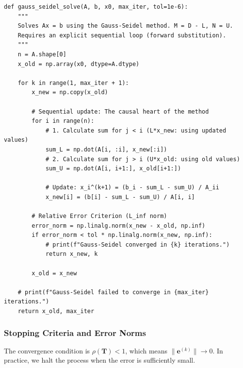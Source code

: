 \begin{verbatim}
def gauss_seidel_solve(A, b, x0, max_iter, tol=1e-6):
    """
    Solves Ax = b using the Gauss-Seidel method. M = D - L, N = U.
    Requires an explicit sequential loop (forward substitution).
    """
    n = A.shape[0]
    x_old = np.array(x0, dtype=A.dtype)
    
    for k in range(1, max_iter + 1):
        x_new = np.copy(x_old)
        
        # Sequential update: The causal heart of the method
        for i in range(n):
            # 1. Calculate sum for j < i (L*x_new: using updated values)
            sum_L = np.dot(A[i, :i], x_new[:i])
            # 2. Calculate sum for j > i (U*x_old: using old values)
            sum_U = np.dot(A[i, i+1:], x_old[i+1:])
            
            # Update: x_i^(k+1) = (b_i - sum_L - sum_U) / A_ii
            x_new[i] = (b[i] - sum_L - sum_U) / A[i, i]
        
        # Relative Error Criterion (L_inf norm)
        error_norm = np.linalg.norm(x_new - x_old, np.inf)
        if error_norm < tol * np.linalg.norm(x_new, np.inf):
            # print(f"Gauss-Seidel converged in {k} iterations.")
            return x_new, k
            
        x_old = x_new
        
    # print(f"Gauss-Seidel failed to converge in {max_iter} iterations.")
    return x_old, max_iter
\end{verbatim}

\subsubsection{Stopping Criteria and Error Norms}

The convergence condition is $\rho(\mathbf{T}) < 1$, which means $\|\mathbf{e}^{(k)}\| \to 0$. In practice, we halt the process when the error is sufficiently small.

